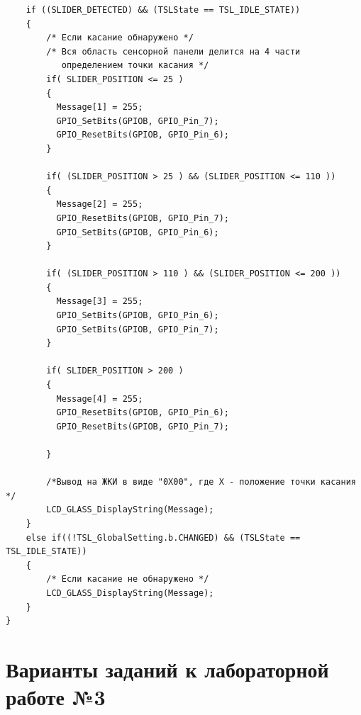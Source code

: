 \begin{verbatim}
    if ((SLIDER_DETECTED) && (TSLState == TSL_IDLE_STATE))
    {
        /* Если касание обнаружено */
        /* Вся область сенсорной панели делится на 4 части 
           определением точки касания */  
        if( SLIDER_POSITION <= 25 )
        {
          Message[1] = 255;       
          GPIO_SetBits(GPIOB, GPIO_Pin_7);
          GPIO_ResetBits(GPIOB, GPIO_Pin_6);
        }
        
        if( (SLIDER_POSITION > 25 ) && (SLIDER_POSITION <= 110 )) 
        {       
          Message[2] = 255; 
          GPIO_ResetBits(GPIOB, GPIO_Pin_7);
          GPIO_SetBits(GPIOB, GPIO_Pin_6);  
        }
        
        if( (SLIDER_POSITION > 110 ) && (SLIDER_POSITION <= 200 )) 
        {      
          Message[3] = 255;  
          GPIO_SetBits(GPIOB, GPIO_Pin_6);
          GPIO_SetBits(GPIOB, GPIO_Pin_7); 
        }
        
        if( SLIDER_POSITION > 200 )
        {    
          Message[4] = 255;
          GPIO_ResetBits(GPIOB, GPIO_Pin_6);
          GPIO_ResetBits(GPIOB, GPIO_Pin_7);

        }
          
        /*Вывод на ЖКИ в виде "0Х00", где Х - положение точки касания */   
        LCD_GLASS_DisplayString(Message);
    } 
    else if((!TSL_GlobalSetting.b.CHANGED) && (TSLState == TSL_IDLE_STATE))
    {     
        /* Если касание не обнаружено */
        LCD_GLASS_DisplayString(Message);
    }
}
\end{verbatim}


\section{Варианты заданий к лабораторной работе №3}

